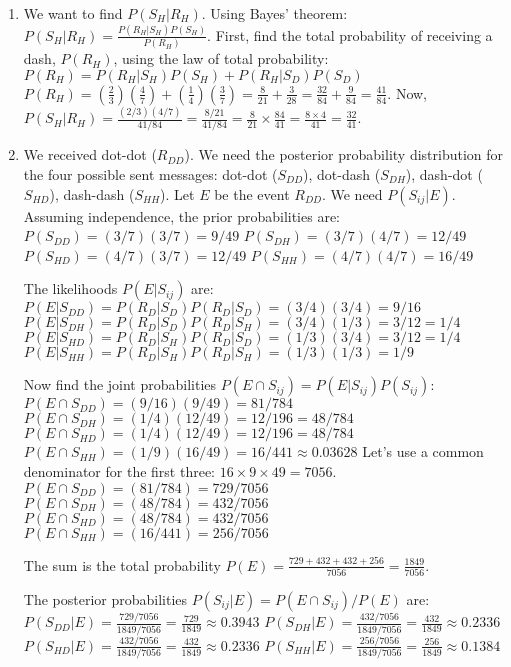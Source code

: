 \begin{enumerate}[label=(\alph*)]
    \item We want to find $P(S_H|R_H)$. Using Bayes' theorem: $P(S_H|R_H) = \frac{P(R_H|S_H)P(S_H)}{P(R_H)}$.
    First, find the total probability of receiving a dash, $P(R_H)$, using the law of total probability:
    $P(R_H) = P(R_H|S_H)P(S_H) + P(R_H|S_D)P(S_D)$
    $P(R_H) = (\frac{2}{3})(\frac{4}{7}) + (\frac{1}{4})(\frac{3}{7}) = \frac{8}{21} + \frac{3}{28} = \frac{32}{84} + \frac{9}{84} = \frac{41}{84}$.
    \vspace{1ex} %
    Now, $P(S_H|R_H) = \frac{(2/3)(4/7)}{41/84} = \frac{8/21}{41/84} = \frac{8}{21} \times \frac{84}{41} = \frac{8 \times 4}{41} = \frac{32}{41}$.

    \item We received dot-dot ($R_{DD}$). We need the posterior probability distribution for the four possible sent messages: dot-dot ($S_{DD}$), dot-dash ($S_{DH}$), dash-dot ($S_{HD}$), dash-dash ($S_{HH}$). Let $E$ be the event $R_{DD}$. We need $P(S_{ij}|E)$.
    Assuming independence, the prior probabilities are:
    $P(S_{DD}) = (3/7)(3/7) = 9/49$
    $P(S_{DH}) = (3/7)(4/7) = 12/49$
    $P(S_{HD}) = (4/7)(3/7) = 12/49$
    $P(S_{HH}) = (4/7)(4/7) = 16/49$

    The likelihoods $P(E|S_{ij})$ are:
    $P(E|S_{DD}) = P(R_D|S_D)P(R_D|S_D) = (3/4)(3/4) = 9/16$
    $P(E|S_{DH}) = P(R_D|S_D)P(R_D|S_H) = (3/4)(1/3) = 3/12 = 1/4$
    $P(E|S_{HD}) = P(R_D|S_H)P(R_D|S_D) = (1/3)(3/4) = 3/12 = 1/4$
    $P(E|S_{HH}) = P(R_D|S_H)P(R_D|S_H) = (1/3)(1/3) = 1/9$

    Now find the joint probabilities $P(E \cap S_{ij}) = P(E|S_{ij})P(S_{ij})$:
    $P(E \cap S_{DD}) = (9/16)(9/49) = 81/784$
    $P(E \cap S_{DH}) = (1/4)(12/49) = 12/196 = 48/784$
    $P(E \cap S_{HD}) = (1/4)(12/49) = 12/196 = 48/784$
    $P(E \cap S_{HH}) = (1/9)(16/49) = 16/441 \approx 0.03628$
    Let's use a common denominator for the first three: $16 \times 9 \times 49 = 7056$.
    $P(E \cap S_{DD}) = (81/784) = 729/7056$
    $P(E \cap S_{DH}) = (48/784) = 432/7056$
    $P(E \cap S_{HD}) = (48/784) = 432/7056$
    $P(E \cap S_{HH}) = (16/441) = 256/7056$

    The sum is the total probability $P(E) = \frac{729+432+432+256}{7056} = \frac{1849}{7056}$.

    The posterior probabilities $P(S_{ij}|E) = P(E \cap S_{ij})/P(E)$ are:
    $P(S_{DD}|E) = \frac{729/7056}{1849/7056} = \frac{729}{1849} \approx 0.3943$
    $P(S_{DH}|E) = \frac{432/7056}{1849/7056} = \frac{432}{1849} \approx 0.2336$
    $P(S_{HD}|E) = \frac{432/7056}{1849/7056} = \frac{432}{1849} \approx 0.2336$
    $P(S_{HH}|E) = \frac{256/7056}{1849/7056} = \frac{256}{1849} \approx 0.1384$
\end{enumerate}




